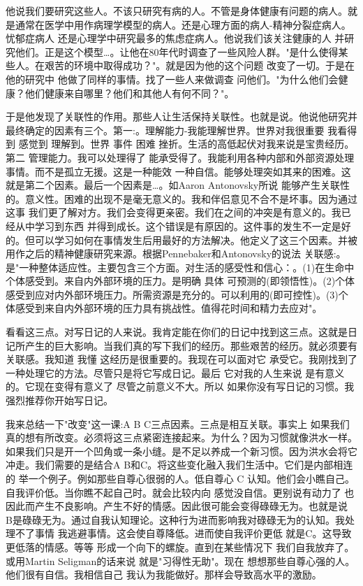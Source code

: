 他说我们要研究这些人。不该只研究有病的人。不管是身体健康有问题的病人。就是通常在医学中用作病理学模型的病人。还是心理方面的病人-精神分裂症病人。忧郁症病人 还是心理学中研究最多的焦虑症病人。他说我们该关注健康的人 并研究他们。正是这个模型…。让他在80年代时调查了一些风险人群。"是什么使得某些人。在艰苦的环境中取得成功？"。就是因为他的这个问题 改变了一切。于是在他的研究中 他做了同样的事情。找了一些人来做调查 问他们。"为什么他们会健康？他们健康来自哪里？他们和其他人有何不同？"。 

于是他发现了关联性的作用。那些人让生活保持关联性。也就是说。他说他研究并最终确定的因素有三个。第一:。理解能力-我能理解世界。世界对我很重要 我看得到 感觉到 理解到。世界 事件 困难 挫折。生活的高低起伏对我来说是宝贵经历。第二 管理能力。我可以处理得了 能承受得了。我能利用各种内部和外部资源处理事情。而不是孤立无援。这是一种能效 一种自信。能够处理突如其来的困难。这就是第二个因素。最后一个因素是…。如Aaron Antonovsky所说 能够产生关联性的。意义性。困难的出现不是毫无意义的。我和伴侣意见不合不是坏事。因为通过这事 我们更了解对方。我们会变得更亲密。我们在之间的冲突是有意义的。我已经从中学习到东西 并得到成长。这个错误是有原因的。这件事的发生不一定是好的。但可以学习如何在事情发生后用最好的方法解决。他定义了这三个因素。并被用作之后的精神健康研究来源。根据Pennebaker和Antonovsky的说法 关联感:。是"一种整体适应性。主要包含三个方面。对生活的感受性和信心：。(1)在生命中个体感受到。来自内外部环境的压力。是明确 具体 可预测的(即领悟性)。(2)个体感受到应对内外部环境压力。所需资源是充分的。可以利用的(即可控性)。(3)个体感受到来自内外部环境的压力具有挑战性。值得花时间和精力去应对"。 

看看这三点。对写日记的人来说。我肯定能在你们的日记中找到这三点。这就是日记所产生的巨大影响。当我们真的写下我们的经历。那些艰苦的经历。就必须要有关联感。我知道 我懂 这经历是很重要的。我现在可以面对它 承受它。我刚找到了一种处理它的方法。尽管只是将它写成日记。最后 它对我的人生来说 是有意义的。它现在变得有意义了 尽管之前意义不大。所以 如果你没有写日记的习惯。我强烈推荐你开始写日记。 

我来总结一下"改变"这一课:A B C三点因素。三点是相互关联。事实上 如果我们真的想有所改变。必须将这三点紧密连接起来。为什么？因为习惯就像洪水一样。如果我们只是开一个凹角或一条小缝。是不足以养成一个新习惯。因为洪水会将它冲走。我们需要的是结合A B和C。将这些变化融入我们生活中。它们是内部相连的 举一个例子。例如那些自尊心很弱的人。低自尊心 C 认知。他们会小瞧自己。自我评价低。当你瞧不起自己时。就会比较内向 感觉没自信。更别说有动力了 也因此而产生不良影响。产生不好的情感。因此很可能会变得碌碌无为。也就是说 B是碌碌无为。通过自我认知理论。这种行为进而影响我对碌碌无为的认知。我处理不了事情 我逃避事情。这会使自尊降低。进而使自我评价更低 就是C。这导致更低落的情感。等等 形成一个向下的螺旋。直到在某些情况下 我们自我放弃了。或用Martin Seligman的话来说 就是"习得性无助"。现在 想想那些自尊心强的人。他们很有自信。我相信自己 我认为我能做好。那样会导致高水平的激励。 

